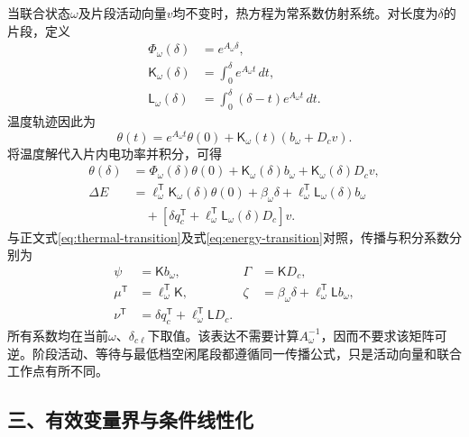 当联合状态$\omega$及片段活动向量$v$均不变时，热方程为常系数仿射系统。对长度为$\delta$的片段，定义
\begin{equation}
\begin{aligned}
\Phi_\omega(\delta)&=e^{A_\omega\delta},\\
\mathsf K_\omega(\delta)&=\int_0^\delta e^{A_\omega t}\,dt,\\
\mathsf L_\omega(\delta)&=\int_0^\delta(\delta-t)e^{A_\omega t}\,dt.
\end{aligned}
\label{eq:matrix-integrals}
\end{equation}
温度轨迹因此为
\begin{equation}
\theta(t)=e^{A_\omega t}\theta(0)
+\mathsf K_\omega(t)(b_\omega+D_cv).
\label{eq:segment-solution}
\end{equation}
将温度解代入片内电功率并积分，可得
\begin{equation}
\begin{aligned}
\theta(\delta)&=\Phi_\omega(\delta)\theta(0)
+\mathsf K_\omega(\delta)b_\omega
+\mathsf K_\omega(\delta)D_cv,\\
\Delta E&=\ell_\omega^{\mathsf T}\mathsf K_\omega(\delta)\theta(0)
+\beta_\omega\delta+\ell_\omega^{\mathsf T}\mathsf L_\omega(\delta)b_\omega\\
&\quad+\left[\delta q_c^{\mathsf T}
+\ell_\omega^{\mathsf T}\mathsf L_\omega(\delta)D_c\right]v.
\end{aligned}
\label{eq:segment-integrals}
\end{equation}
与正文式\eqref{eq:thermal-transition}及式\eqref{eq:energy-transition}对照，传播与积分系数分别为
\begin{equation}
\begin{aligned}
\psi&=\mathsf Kb_\omega,&\Gamma&=\mathsf KD_c,\\
\mu^{\mathsf T}&=\ell_\omega^{\mathsf T}\mathsf K,&
\zeta&=\beta_\omega\delta+\ell_\omega^{\mathsf T}\mathsf Lb_\omega,\\
\nu^{\mathsf T}&=\delta q_c^{\mathsf T}+\ell_\omega^{\mathsf T}\mathsf LD_c.
\end{aligned}
\label{eq:integral-coefficients}
\end{equation}
所有系数均在当前$\omega$、$\delta_{c\ell}$下取值。该表达不需要计算$A_\omega^{-1}$，因而不要求该矩阵可逆。阶段活动、等待与最低档空闲尾段都遵循同一传播公式，只是活动向量和联合工作点有所不同。

\subsection*{三、有效变量界与条件线性化}

